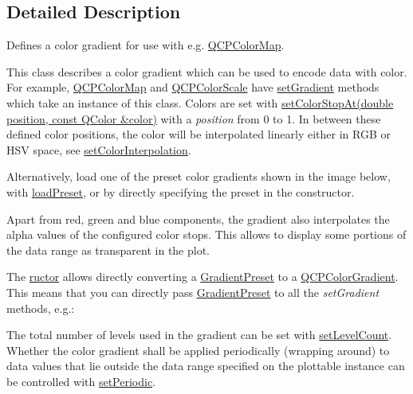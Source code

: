 \subsection{Detailed Description}
Defines a color gradient for use with e.\+g. \hyperlink{classQCPColorMap}{Q\+C\+P\+Color\+Map}. 

This class describes a color gradient which can be used to encode data with color. For example, \hyperlink{classQCPColorMap}{Q\+C\+P\+Color\+Map} and \hyperlink{classQCPColorScale}{Q\+C\+P\+Color\+Scale} have \hyperlink{classQCPColorMap_a7313c78360471cead3576341a2c50377}{set\+Gradient} methods which take an instance of this class. Colors are set with \hyperlink{classQCPColorGradient_a3b48be5e78079db1bb2a1188a4c3390e}{set\+Color\+Stop\+At(double position, const Q\+Color \&color)} with a {\itshape position} from 0 to 1. In between these defined color positions, the color will be interpolated linearly either in R\+GB or H\+SV space, see \hyperlink{classQCPColorGradient_aa13fda86406e1d896a465a409ae63b38}{set\+Color\+Interpolation}.

Alternatively, load one of the preset color gradients shown in the image below, with \hyperlink{classQCPColorGradient_aa0aeec1528241728b9671bf8e60b1622}{load\+Preset}, or by directly specifying the preset in the constructor.

Apart from red, green and blue components, the gradient also interpolates the alpha values of the configured color stops. This allows to display some portions of the data range as transparent in the plot.



The \hyperlink{classQCPColorGradient}{ructor} allows directly converting a \hyperlink{classQCPColorGradient_aed6569828fee337023670272910c9072}{Gradient\+Preset} to a \hyperlink{classQCPColorGradient}{Q\+C\+P\+Color\+Gradient}. This means that you can directly pass \hyperlink{classQCPColorGradient_aed6569828fee337023670272910c9072}{Gradient\+Preset} to all the {\itshape set\+Gradient} methods, e.\+g.\+: 
\begin{DoxyCodeInclude}
\end{DoxyCodeInclude}
 The total number of levels used in the gradient can be set with \hyperlink{classQCPColorGradient_a18da587eb4f7fc788ea28ba15b6a12de}{set\+Level\+Count}. Whether the color gradient shall be applied periodically (wrapping around) to data values that lie outside the data range specified on the plottable instance can be controlled with \hyperlink{classQCPColorGradient_a39d6448155fc00a219f239220d14bb39}{set\+Periodic}. 

